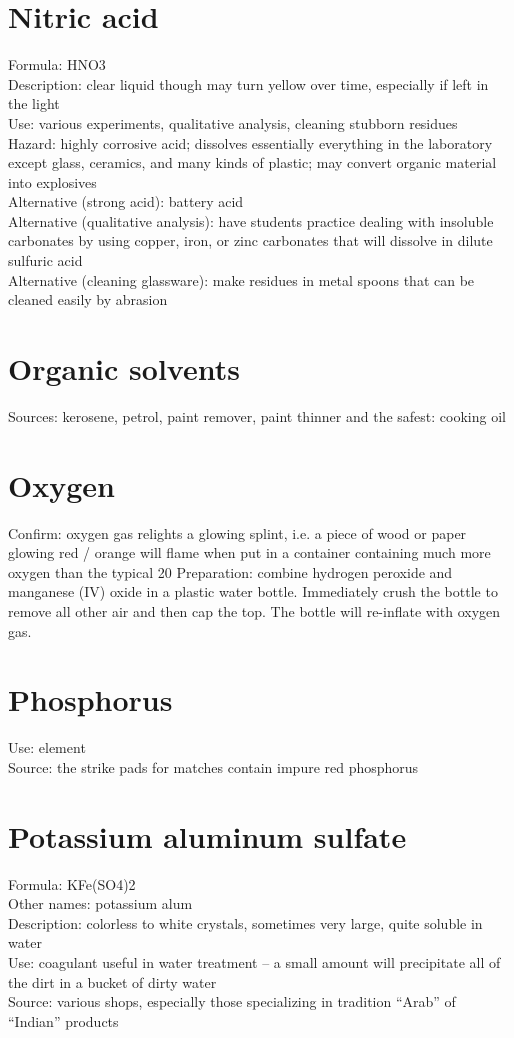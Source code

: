 \section{Nitric acid}
Formula: HNO3\\
Description: clear liquid though may turn yellow over time, 
especially if left in the light\\
Use: various experiments, 
qualitative analysis, 
cleaning stubborn residues\\
Hazard: highly corrosive acid; 
dissolves essentially everything in the laboratory except glass, 
ceramics, 
and many kinds of plastic; 
may convert organic material into explosives\\
Alternative (strong acid): battery acid\\
Alternative (qualitative analysis): 
have students practice dealing with insoluble carbonates by using copper, 
iron, 
or zinc carbonates that will dissolve in dilute sulfuric acid\\
Alternative (cleaning glassware): 
make residues in metal spoons that can be cleaned easily by abrasion

\section{Organic solvents}
Sources: kerosene, 
petrol, 
paint remover, 
paint thinner and the safest: cooking oil

\section{Oxygen}
Confirm: oxygen gas relights a glowing splint, 
i.e. 
a piece of wood or paper glowing red / orange 
will flame when put in a container 
containing much more oxygen than the typical 20%
Preparation: combine hydrogen peroxide 
and manganese (IV) oxide in a plastic water bottle. 
Immediately crush the bottle to remove all other air and then cap the top. 
The bottle will re-inflate with oxygen gas.

\section{Phosphorus}
Use: element\\
Source: the strike pads for matches contain impure red phosphorus

\section{Potassium aluminum sulfate}
Formula: KFe(SO4)2\\
Other names: potassium alum\\
Description: colorless to white crystals, 
sometimes very large, 
quite soluble in water\\
Use: coagulant useful in water treatment – 
a small amount will precipitate all of the dirt in a bucket of dirty water\\
Source: various shops, 
especially those specializing in tradition “Arab” of “Indian” products

